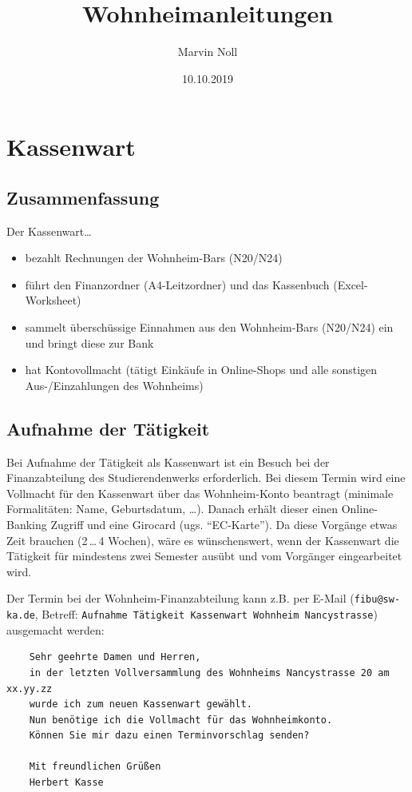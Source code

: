 \documentclass[10pt,a4paper,noendnumber=true]{scrartcl}
\title{Wohnheimanleitungen}
\subtitle{}
\author{Marvin Noll}
\date{10.10.2019}
\begin{document}

\section{Kassenwart}
\subsection{Zusammenfassung}
Der Kassenwart\ldots
\begin{itemize}
	\item bezahlt Rechnungen der Wohnheim-Bars (N20/N24)
	\item führt den Finanzordner (A4-Leitzordner) und das Kassenbuch (Excel-Worksheet)
	\item sammelt überschüssige Einnahmen aus den Wohnheim-Bars (N20/N24) ein und bringt diese zur Bank
	\item hat Kontovollmacht (tätigt Einkäufe in Online-Shops und alle sonstigen Aus-/Einzahlungen des Wohnheims)
\end{itemize}

\subsection{Aufnahme der Tätigkeit}
Bei Aufnahme der Tätigkeit als Kassenwart ist ein Besuch bei der Finanzabteilung des Studierendenwerks erforderlich. Bei diesem Termin wird eine Vollmacht für den Kassenwart über das Wohnheim-Konto beantragt (minimale Formalitäten: Name, Geburtsdatum, \ldots). Danach erhält dieser einen Online-Banking Zugriff und eine Girocard (ugs. "`EC-Karte"'). Da diese Vorgänge etwas Zeit brauchen (2\,\ldots\,4 Wochen), wäre es wünschenswert, wenn der Kassenwart die Tätigkeit für mindestens zwei Semester ausübt und vom Vorgänger eingearbeitet wird.

Der Termin bei der Wohnheim-Finanzabteilung kann z.B. per E-Mail (\texttt{fibu@sw-ka.de}, Betreff: \texttt{Aufnahme Tätigkeit Kassenwart Wohnheim Nancystrasse}) ausgemacht werden:
\begin{verbatim}
	Sehr geehrte Damen und Herren,
	in der letzten Vollversammlung des Wohnheims Nancystrasse 20 am xx.yy.zz
	wurde ich zum neuen Kassenwart gewählt.
	Nun benötige ich die Vollmacht für das Wohnheimkonto.
	Können Sie mir dazu einen Terminvorschlag senden?
	
	Mit freundlichen Grüßen
	Herbert Kasse
\end{verbatim}
\end{document}

